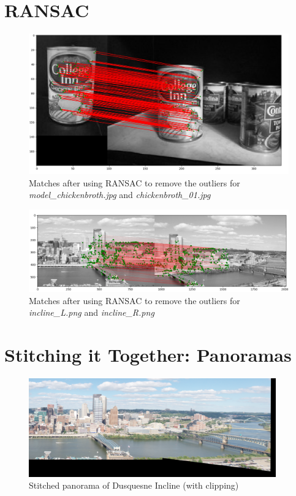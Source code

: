\documentclass[a4paper]{article}
\begin{document}
\section{RANSAC}
\begin{figure}[!ht]
    \centering
    \includegraphics[width=\textwidth]{images/BRIEF_matches_RANSAC}
    \caption{Matches after using RANSAC to remove the outliers for \textit{model\_chickenbroth.jpg} and \textit{chickenbroth\_01.jpg}}
\end{figure}

\begin{figure}[!ht]
    \centering
    \includegraphics[width=\textwidth]{images/incline_RANSAC}
    \caption{Matches after using RANSAC to remove the outliers for \textit{incline\_L.png} and \textit{incline\_R.png}}
\end{figure}

\section{Stitching it Together: Panoramas}

\begin{figure}[!ht]
    \centering
    \includegraphics[width=0.95\textwidth]{images/pano_clip}
    \caption{Stitched panorama of Dusquesne Incline (with clipping)}
\end{figure}
\end{document}
